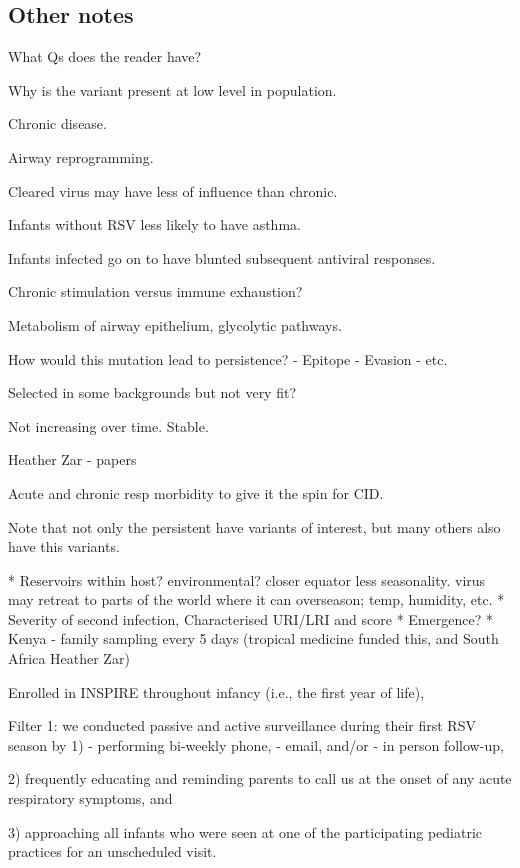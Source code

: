 \subsection{Other notes}
\begin{description}[noitemsep]
\item What Qs does the reader have?
\item Why is the variant present at low level in population. 
\item Chronic disease.
\item Airway reprogramming.
\item Cleared virus may have less of influence than chronic.
\item Infants without RSV less likely to have asthma.
\item Infants infected go on to have blunted subsequent antiviral responses.
\item Chronic stimulation versus immune exhaustion?
\item Metabolism of airway epithelium, glycolytic pathways.
\item How would this mutation lead to persistence? 
	- Epitope
	- Evasion
	- etc.
\item Selected in some backgrounds but not very fit?
\item Not increasing over time. Stable.
\item Heather Zar - papers
\item Acute and chronic resp morbidity to give it the spin for CID.
	\item Note that not only the persistent have variants of interest, but many others also have this variants. 
\end{description}
* Reservoirs within host? environmental? closer equator less seasonality. virus may retreat to parts of the world where it can overseason; temp, humidity, etc.
* Severity of second infection, Characterised URI/LRI and score
* Emergence?
* Kenya - family sampling every 5 days (tropical medicine funded this, and South Africa Heather Zar)

Enrolled in INSPIRE throughout infancy (i.e., the first year of life), 

Filter 1:
we conducted passive and active surveillance during their first RSV season by 
1)	- performing bi-weekly phone, 
	- email, and/or 
	- in person follow-up, 

2) frequently educating and reminding parents to call us at the onset of any acute respiratory symptoms, and 

3) approaching all infants who were seen at one of the participating pediatric practices for an unscheduled visit. 

